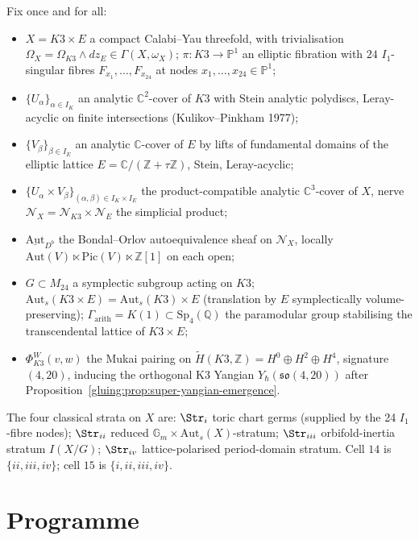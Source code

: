 \documentclass[11pt]{amsart}
\providecommand{\C}{\mathbb{C}}
\providecommand{\Z}{\mathbb{Z}}
\providecommand{\Q}{\mathbb{Q}}
\providecommand{\Aut}{\mathrm{Aut}}
\providecommand{\Pic}{\mathrm{Pic}}
\providecommand{\cN}{\mathcal{N}}
\providecommand{\fso}{\mathfrak{so}}
\providecommand{\Sp}{\mathrm{Sp}}
\providecommand{\Gm}{\mathbb{G}_m}
\begin{document}
Fix once and for all:
\begin{itemize}
\item $X = K3 \times E$ a compact Calabi--Yau threefold, with trivialisation
  $\Omega_X = \Omega_{K3} \wedge dz_E \in \Gamma(X, \omega_X)$;
  $\pi: K3 \to \mathbb{P}^1$ an elliptic fibration with $24$
  $I_1$-singular fibres $F_{x_1}, \ldots, F_{x_{24}}$ at nodes
  $x_1, \ldots, x_{24} \in \mathbb{P}^1$;
\item $\{U_\alpha\}_{\alpha \in I_K}$ an analytic $\C^2$-cover of $K3$
  with Stein analytic polydiscs, Leray-acyclic on finite intersections
  (Kulikov--Pinkham 1977);
\item $\{V_\beta\}_{\beta \in I_E}$ an analytic $\C$-cover of $E$ by
  lifts of fundamental domains of the elliptic lattice
  $E = \C / (\Z + \tau \Z)$, Stein, Leray-acyclic;
\item $\{U_\alpha \times V_\beta\}_{(\alpha, \beta) \in I_K \times I_E}$
  the product-compatible analytic $\C^3$-cover of $X$, nerve
  $\cN_X = \cN_{K3} \times \cN_E$ the simplicial product;
\item $\underline{\Aut}_{D^b}$ the Bondal--Orlov autoequivalence sheaf
  on $\cN_X$, locally
  $\Aut(V) \ltimes \Pic(V) \ltimes \Z[1]$ on each open;
\item $G \subset M_{24}$ a symplectic subgroup acting on $K3$;
  $\Aut_s(K3 \times E) = \Aut_s(K3) \times E$ (translation by $E$
  symplectically volume-preserving); $\Gamma_{\mathrm{arith}} = K(1)
  \subset \Sp_4(\Q)$ the paramodular group stabilising the
  transcendental lattice of $K3 \times E$;
\item $\Phi_{K3}^W(v, w)$ the Mukai pairing on
  $\widetilde{H}(K3, \Z) = H^0 \oplus H^2 \oplus H^4$, signature
  $(4, 20)$, inducing the orthogonal K3 Yangian
  $Y_\hbar(\fso(4, 20))$ after Proposition~\ref{gluing:prop:super-yangian-emergence}.
\end{itemize}

The four classical strata on $X$ are:
$\Str_i$ toric chart germs (supplied by the 24 $I_1$-fibre nodes);
$\Str_{ii}$ reduced $\Gm \times \Aut_s(X)$-stratum;
$\Str_{iii}$ orbifold-inertia stratum $I(X/G)$;
$\Str_{iv}$ lattice-polarised period-domain stratum. Cell $14$ is
$\{ii, iii, iv\}$; cell $15$ is $\{i, ii, iii, iv\}$.

\section*{Programme}
\end{document}
